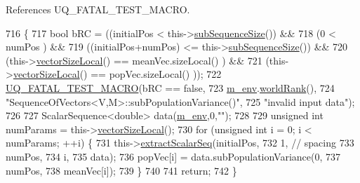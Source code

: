 References U\-Q\-\_\-\-F\-A\-T\-A\-L\-\_\-\-T\-E\-S\-T\-\_\-\-M\-A\-C\-R\-O.


\begin{DoxyCode}
716 \{
717   \textcolor{keywordtype}{bool} bRC = ((initialPos              <  this->\hyperlink{class_q_u_e_s_o_1_1_sequence_of_vectors_a0224bd3e961d86af5d2886301c0c2b86}{subSequenceSize}()) &&
718               (0                       <  numPos                 ) &&
719               ((initialPos+numPos)     <= this->\hyperlink{class_q_u_e_s_o_1_1_sequence_of_vectors_a0224bd3e961d86af5d2886301c0c2b86}{subSequenceSize}()) &&
720               (this->\hyperlink{class_q_u_e_s_o_1_1_base_vector_sequence_a2fefedf9e5b90f22881103b3f92555f6}{vectorSizeLocal}() == meanVec.sizeLocal()    ) &&
721               (this->\hyperlink{class_q_u_e_s_o_1_1_base_vector_sequence_a2fefedf9e5b90f22881103b3f92555f6}{vectorSizeLocal}() == popVec.sizeLocal()     ));
722   \hyperlink{_defines_8h_a56d63d18d0a6d45757de47fcc06f574d}{UQ\_FATAL\_TEST\_MACRO}(bRC == \textcolor{keyword}{false},
723                       \hyperlink{class_q_u_e_s_o_1_1_base_vector_sequence_a8e8824d2a63c5a43bcc6473e3a0491e8}{m\_env}.\hyperlink{class_q_u_e_s_o_1_1_base_environment_a78b57112bbd0e6dd0e8afec00b40ffa7}{worldRank}(),
724                       \textcolor{stringliteral}{"SequenceOfVectors<V,M>::subPopulationVariance()"},
725                       \textcolor{stringliteral}{"invalid input data"});
726 
727   ScalarSequence<double> data(\hyperlink{class_q_u_e_s_o_1_1_base_vector_sequence_a8e8824d2a63c5a43bcc6473e3a0491e8}{m\_env},0,\textcolor{stringliteral}{""});
728 
729   \textcolor{keywordtype}{unsigned} \textcolor{keywordtype}{int} numParams = this->\hyperlink{class_q_u_e_s_o_1_1_base_vector_sequence_a2fefedf9e5b90f22881103b3f92555f6}{vectorSizeLocal}();
730   \textcolor{keywordflow}{for} (\textcolor{keywordtype}{unsigned} \textcolor{keywordtype}{int} i = 0; i < numParams; ++i) \{
731     this->\hyperlink{class_q_u_e_s_o_1_1_sequence_of_vectors_ac977b3b26a6af2ae727671f1246262fd}{extractScalarSeq}(initialPos,
732                            1, \textcolor{comment}{// spacing}
733                            numPos,
734                            i,
735                            data);
736     popVec[i] = data.subPopulationVariance(0,
737                                            numPos,
738                                            meanVec[i]);
739   \}
740 
741   \textcolor{keywordflow}{return};
742 \}
\end{DoxyCode}
